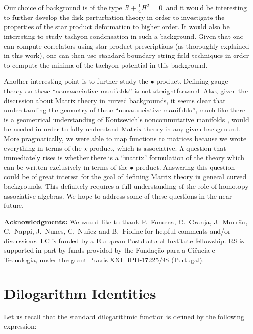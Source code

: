 \documentclass[a4paper,11pt]{article}
\newcommand{\vs}[1]{\vspace{#1 mm}}
\begin{document}
Our choice of background is of the type $R + \frac{1}{4} H^{2} = 0$, and it
would be interesting to further develop the disk perturbation theory in
order to investigate the properties of the star product deformation to
higher order. It would also be interesting to study tachyon condensation in
such a background. Given that one can compute correlators using star
product prescriptions (as thoroughly explained in this work), one can then
use standard boundary string field techniques in order to compute the
minima of the tachyon potential in this background.

Another interesting point is to further study the $\bullet$ product.
Defining gauge theory on these ``nonassociative manifolds'' is not
straightforward. Also, given the discussion about Matrix theory in curved
backgrounds, it seems clear that understanding the geometry of these
``nonassociative manifolds'', much like there is a geometrical
understanding of Kontsevich's noncommutative manifolds \cite{BFFLS,
Fedosov, JSW}, would be needed in order to fully understand Matrix theory
in any given background. More pragmatically, we were able to map functions
to matrices because we wrote everything in terms of the $\star$ product,
which is associative. A question that immediately rises is whether there is
a ``matrix'' formulation of the theory which can be written exclusively in
terms of the $\bullet$ product. Answering this question could be of great
interest for the goal of defining Matrix theory in general curved
backgrounds. This definitely requires a full understanding of the role of
homotopy associative algebras. We hope to address some of these questions
in the near future.


\vs{5}
\noindent
{\small 
{\bf Acknowledgments:}
We would like to thank P.~Fonseca, G.~Granja, J.~Mour\~ao, C.~Nappi,
J.~Nunes, C.~Nu\~nez and B.~Pioline for helpful comments and/or
discussions. LC is funded by a European Postdoctoral Institute
fellowship. RS is supported in part by funds provided by the Funda\c c\~ao
para a Ci\^encia e Tecnologia, under the grant Praxis XXI BPD-17225/98
(Portugal).
}

\eject

\appendix


\section{Dilogarithm Identities}


Let us recall that the standard dilogarithmic function is defined by the
following expression:
\end{document}
